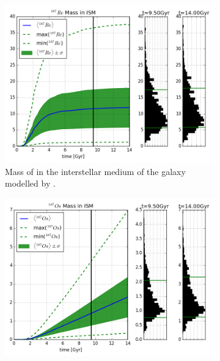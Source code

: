 \begin{figure}
  \centering
  \begin{subfigure}{\subfigwidth}
    \includegraphics[width=\linewidth]{results/MCExperiment_revised_2_imfslope/combined_plot_Re-187_decayed.png}
    \caption{\label{fig:MCExperiment-imfslope-re187}
      Mass of  in the interstellar medium of the galaxy modelled by \omegamodel.
    }
  \end{subfigure}
  \begin{subfigure}{\subfigwidth}
    \includegraphics[width=\linewidth]{results/MCExperiment_revised_2_imfslope/combined_plot_Os-187_decayed.png}
    \caption{\label{fig:MCExperiment-imfslope-os187}
}
\end{subfigure}
\end{figure}
